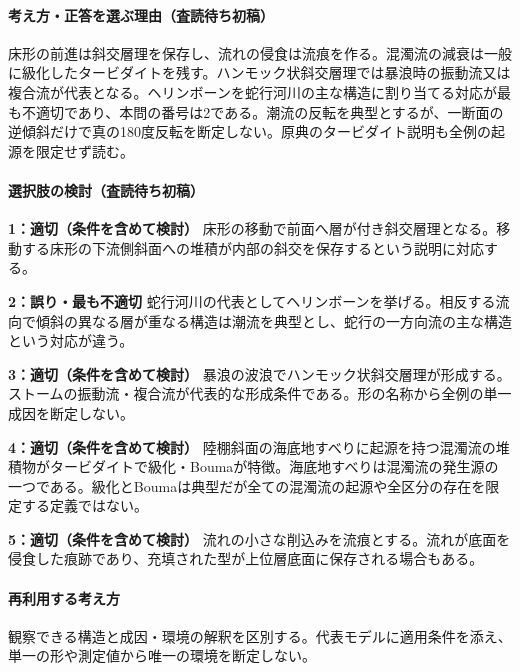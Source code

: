 \paragraph{考え方・正答を選ぶ理由（査読待ち初稿）} 床形の前進は斜交層理を保存し、流れの侵食は流痕を作る。混濁流の減衰は一般に級化したタービダイトを残す。ハンモック状斜交層理では暴浪時の振動流又は複合流が代表となる。ヘリンボーンを蛇行河川の主な構造に割り当てる対応が最も不適切であり、本問の番号は2である。潮流の反転を典型とするが、一断面の逆傾斜だけで真の180度反転を断定しない。原典のタービダイト説明も全例の起源を限定せず読む。

\paragraph{選択肢の検討（査読待ち初稿）}\mbox{}\par

\noindent\textbf{1：適切（条件を含めて検討）} 床形の移動で前面へ層が付き斜交層理となる。移動する床形の下流側斜面への堆積が内部の斜交を保存するという説明に対応する。\par

\noindent\textbf{2：誤り・最も不適切} 蛇行河川の代表としてヘリンボーンを挙げる。相反する流向で傾斜の異なる層が重なる構造は潮流を典型とし、蛇行の一方向流の主な構造という対応が違う。\par

\noindent\textbf{3：適切（条件を含めて検討）} 暴浪の波浪でハンモック状斜交層理が形成する。ストームの振動流・複合流が代表的な形成条件である。形の名称から全例の単一成因を断定しない。\par

\noindent\textbf{4：適切（条件を含めて検討）} 陸棚斜面の海底地すべりに起源を持つ混濁流の堆積物がタービダイトで級化・Boumaが特徴。海底地すべりは混濁流の発生源の一つである。級化とBoumaは典型だが全ての混濁流の起源や全区分の存在を限定する定義ではない。\par

\noindent\textbf{5：適切（条件を含めて検討）} 流れの小さな削込みを流痕とする。流れが底面を侵食した痕跡であり、充填された型が上位層底面に保存される場合もある。\par

\paragraph{再利用する考え方} 観察できる構造と成因・環境の解釈を区別する。代表モデルに適用条件を添え、単一の形や測定値から唯一の環境を断定しない。

